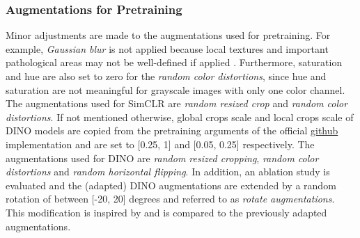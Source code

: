 \subsubsection{Augmentations for Pretraining}
\label{section: augmentations for pretraining}
Minor adjustments are made to the augmentations used for pretraining.
For example, \textit{Gaussian blur} is not applied because local textures and important pathological areas may not be well-defined if applied \citep{Azizi2021}.
Furthermore, saturation and hue are also set to zero for the \textit{random color distortions}, since hue and saturation are not meaningful for grayscale images with only one color channel.
The augmentations used for SimCLR are \textit{random resized crop} and \textit{random color distortions}.
If not mentioned otherwise, global crops scale and local crops scale of DINO models are copied from the pretraining arguments of the official \href{https://github.com/facebookresearch/dino#pretrained-models}{github} implementation and are set to [0.25, 1] and [0.05, 0.25] respectively. 
The augmentations used for DINO are \textit{random resized cropping}, \textit{random color distortions} and \textit{random horizontal flipping}.
In addition, an ablation study is evaluated and the (adapted) DINO augmentations are extended by a random rotation of between [-20, 20] degrees and referred to as \textit{rotate augmentations}. 
This modification is inspired by \citep{Azizi2021} and is compared to the previously adapted augmentations.
\par
